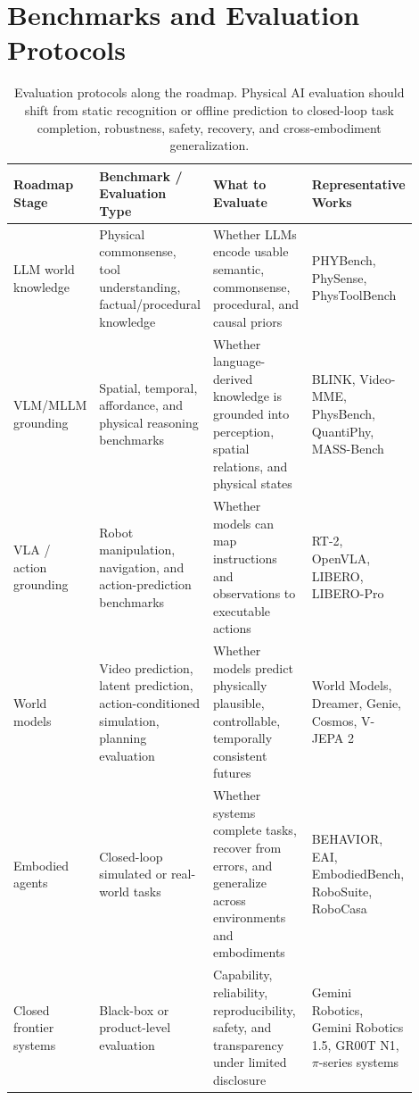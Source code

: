 \section{Benchmarks and Evaluation Protocols}
\label{app:evaluation}

\begin{table}[t]
\centering
\small
\begin{tabular}{p{0.15\linewidth}p{0.23\linewidth}p{0.30\linewidth}p{0.22\linewidth}}
\toprule
Roadmap Stage & Benchmark / Evaluation Type & What to Evaluate & Representative Works \\
\midrule
LLM world knowledge
& Physical commonsense, tool understanding, factual/procedural knowledge
& Whether LLMs encode usable semantic, commonsense, procedural, and causal priors
& PHYBench, PhySense, PhysToolBench~\citep{qiu2025phybench,xu2025physense,zhang2025phystoolbench} \\
\midrule
VLM/MLLM grounding
& Spatial, temporal, affordance, and physical reasoning benchmarks
& Whether language-derived knowledge is grounded into perception, spatial relations, and physical states
& BLINK, Video-MME, PhysBench, QuantiPhy, MASS-Bench~\citep{fu2024blink,fu2025video,chow2025physbench,puyin2025quantiphy,wu2025mass} \\
\midrule
VLA / action grounding
& Robot manipulation, navigation, and action-prediction benchmarks
& Whether models can map instructions and observations to executable actions
& RT-2, OpenVLA, LIBERO, LIBERO-Pro~\citep{zitkovich2023rt,kim2024openvla,liu2023libero,zhou2025libero} \\
\midrule
World models
& Video prediction, latent prediction, action-conditioned simulation, planning evaluation
& Whether models predict physically plausible, controllable, temporally consistent futures
& World Models, Dreamer, Genie, Cosmos, V-JEPA 2~\citep{ha2018world,hafner2020dreamer,bruce2024genie,agarwal2025cosmos,assran2025vjepa2} \\
\midrule
Embodied agents
& Closed-loop simulated or real-world tasks
& Whether systems complete tasks, recover from errors, and generalize across environments and embodiments
& BEHAVIOR, EAI, EmbodiedBench, RoboSuite, RoboCasa~\citep{srivastavabehavior,li2024embodied,yang2025embodiedbench,zhu2020robosuite,nasiriany2024robocasa} \\
\midrule
Closed frontier systems
& Black-box or product-level evaluation
& Capability, reliability, reproducibility, safety, and transparency under limited disclosure
& Gemini Robotics, Gemini Robotics 1.5, GR00T N1, $\pi$-series systems~\citep{team2025gemini1,team2025gemini15,bjorck2025gr00tn1,black2024pi0,physicalintelligence2025pi05,intelligence2026pi} \\
\bottomrule
\end{tabular}
\caption{Evaluation protocols along the roadmap. Physical AI evaluation should shift from static recognition or offline prediction to closed-loop task completion, robustness, safety, recovery, and cross-embodiment generalization.}
\label{tab:evaluation-protocols}
\end{table}

